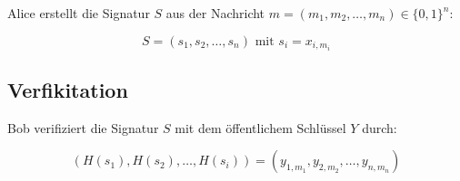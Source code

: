 \documentclass[a4paper,12pt,oneside]{scrreprt}
\begin{document}
Alice erstellt die Signatur $S$ aus der Nachricht $m = (m_1, m_2, \dots, m_n) \in \{0,1\}^n$:

\[ S = (s_1, s_2, \dots, s_n) \text{ mit } s_i = x_{i,m_i}\]

\subsection*{Verfikitation}

Bob verifiziert die Signatur $S$ mit dem öffentlichem Schlüssel $Y$ durch:

\[ (H(s_1),H(s_2),\dots,H(s_i)) = (y_{1,m_1},y_{2,m_2},\dots,y_{n,m_n})\]
\end{document}

